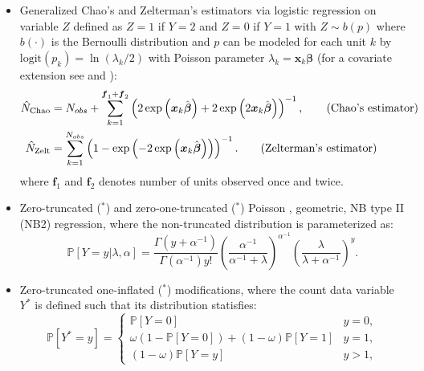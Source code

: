 \documentclass[nojss]{jss}
\newcommand{\1}{\mathcal{I}} \newcommand{\bZero}{\boldsymbol{0}}
\begin{document}
\begin{itemize}
    \item Generalized Chao's \citep{chao1987estimating} and Zelterman's \citep{zelterman1988robust} estimators via logistic regression on variable $Z$ defined as $Z=1$ if $Y=2$ and $Z=0$ if $Y=1$ with $Z\sim b(p)$ where $b(\cdot)$ is the Bernoulli distribution and $p$ can be modeled for each unit $k$ by $\text{logit}(p_k)=\ln(\lambda_k/2)$ with Poisson parameter $\lambda_k=\boldsymbol{x}_{k}\boldsymbol{\beta}$ (for a covariate extension see \cite{chao-generalization} and \cite{zelterman}):
    \begin{align}
        \hat{N}_{\text{Chao}} &= N_{obs}+
        \sum_{k=1}^{\boldsymbol{f}_{1}+\boldsymbol{f}_{2}}
        \left(2\exp\left(\boldsymbol{x}_{k}\hat{\boldsymbol{\beta}}\right)+
        2\exp\left(2\boldsymbol{x}_{k}\hat{\boldsymbol{\beta}}\right)\right)^{-1},
        \tag{\text{Chao's estimator}}\\
        \hat{N}_{\text{Zelt}}&=\sum_{k=1}^{N_{obs}}
        \left(1-\exp\left(-2\exp\left(\boldsymbol{x}_{k}\hat{\boldsymbol{\beta}}\right)\right)\right)^{-1}.
        \tag{\text{Zelterman's estimator}}
    \end{align}
    where $\boldsymbol{f}_{1}$ and $\boldsymbol{f}_{2}$ denotes number of units observed once and twice.
    \item Zero-truncated ($^\ast$) and zero-one-truncated ($^\ast$) Poisson \citep[cf. ][]{zotmodels}, geometric, NB type II (NB2) regression, where the non-truncated distribution is parameterized as:
    \begin{equation*}
        \mathbb{P}[Y=y|\lambda,\alpha] = \frac{\Gamma\left(y+\alpha^{-1}\right)}{\Gamma\left(\alpha^{-1}\right)y!}
        \left(\frac{\alpha^{-1}}{\alpha^{-1}+\lambda}\right)^{\alpha^{-1}}
        \left(\frac{\lambda}{\lambda + \alpha^{-1}}\right)^{y}.
    \end{equation*}
    \item Zero-truncated one-inflated ($^\ast$) modifications, where the count data variable $Y^{\ast}$ is defined such that its distribution statisfies:
    \begin{equation*}
    \mathbb{P}\left[Y^{\ast}=y\right]=
    \begin{cases}
    \mathbb{P}[Y=0] & y=0, \\
    \omega\left(1-\mathbb{P}[Y=0]\right)+(1-\omega)\mathbb{P}[Y=1] & y=1, \\
    (1-\omega)\mathbb{P}[Y=y] & y>1,
    \end{cases}

\end{equation*}
\end{itemize}
\end{document}
